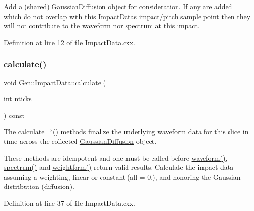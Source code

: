Add a (shared) \hyperlink{class_wire_cell_1_1_gen_1_1_gaussian_diffusion}{Gaussian\+Diffusion} object for consideration. If any are added which do not overlap with this \hyperlink{class_wire_cell_1_1_gen_1_1_impact_data}{Impact\+Data}\textquotesingle{}s impact/pitch sample point then they will not contribute to the waveform nor spectrum at this impact. 

Definition at line 12 of file Impact\+Data.\+cxx.

\mbox{\label{class_wire_cell_1_1_gen_1_1_impact_data_a323019d50d44dea084f1691da674b755}} 
\subsubsection{\texorpdfstring{calculate()}{calculate()}}
{\footnotesize\ttfamily void Gen\+::\+Impact\+Data\+::calculate (\begin{DoxyParamCaption}\item[{int}]{nticks }\end{DoxyParamCaption}) const}

The {\ttfamily calculate\+\_\+$\ast$()} methods finalize the underlying waveform data for this slice in time across the collected \hyperlink{class_wire_cell_1_1_gen_1_1_gaussian_diffusion}{Gaussian\+Diffusion} object.

These methods are idempotent and one must be called before \hyperlink{class_wire_cell_1_1_gen_1_1_impact_data_a80d2f6a9ccdbba236c9e75360316b014}{waveform()}, \hyperlink{class_wire_cell_1_1_gen_1_1_impact_data_afb1c936f26afc1f968f727b3f72af2e4}{spectrum()} and \hyperlink{class_wire_cell_1_1_gen_1_1_impact_data_a8a2ccedf08eab6acee300809308ef216}{weightform()} return valid results. Calculate the impact data assuming a weighting, linear or constant (all = 0.), and honoring the Gaussian distribution (diffusion). 

Definition at line 37 of file Impact\+Data.\+cxx.

